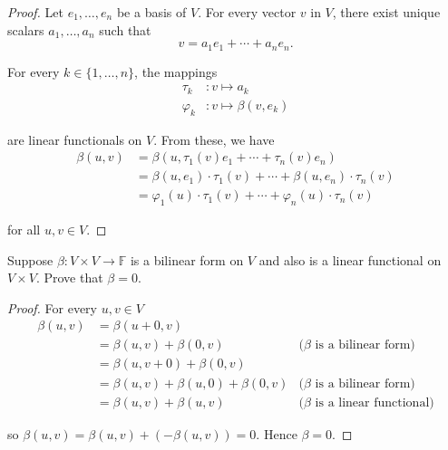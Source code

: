 \begin{proof}
    Let $e_{1}, \ldots, e_{n}$ be a basis of $V$. For every vector $v$ in $V$, there exist unique scalars $a_{1}, \ldots, a_{n}$ such that
    \[
        v = a_{1}e_{1} + \cdots + a_{n}e_{n}.
    \]

    For every $k\in\{1,\ldots,n\}$, the mappings
    \begin{align*}
        \tau_{k}    & : v \mapsto a_{k}           \\
        \varphi_{k} & : v \mapsto \beta(v, e_{k})
    \end{align*}

    are linear functionals on $V$. From these, we have
    \begin{align*}
        \beta(u, v) & = \beta(u, \tau_{1}(v)e_{1} + \cdots + \tau_{n}(v)e_{n})                     \\
                    & = \beta(u, e_{1})\cdot\tau_{1}(v) + \cdots + \beta(u, e_{n})\cdot\tau_{n}(v) \\
                    & = \varphi_{1}(u)\cdot\tau_{1}(v) + \cdots + \varphi_{n}(u)\cdot\tau_{n}(v)
    \end{align*}

    for all $u, v\in V$.
\end{proof}
\newpage

\begin{exercise}\label{chapter9:sectionA:exercise3}
    Suppose $\beta: V\times V\to\mathbb{F}$ is a bilinear form on $V$ and also is a linear functional on $V\times V$. Prove that $\beta = 0$.
\end{exercise}

\begin{proof}
    For every $u, v\in V$
    \begin{align*}
        \beta(u, v) & = \beta(u + 0, v)                                                                   \\
                    & = \beta(u, v) + \beta(0, v)               & \text{($\beta$ is a bilinear form)}     \\
                    & = \beta(u, v + 0) + \beta(0, v)                                                     \\
                    & = \beta(u, v) + \beta(u, 0) + \beta(0, v) & \text{($\beta$ is a bilinear form)}     \\
                    & = \beta(u, v) + \beta(u, v)               & \text{($\beta$ is a linear functional)}
    \end{align*}

    so $\beta(u, v) = \beta(u, v) + (-\beta(u, v)) = 0$. Hence $\beta = 0$.
\end{proof}
\newpage

